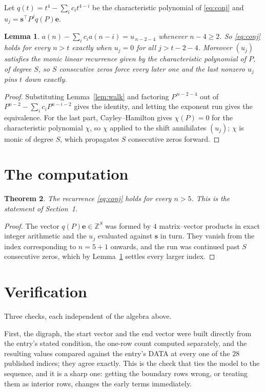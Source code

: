 \documentclass[11pt,a4paper]{article}
\theoremstyle{plain}
\newtheorem{theorem}{Theorem}
\newtheorem{lemma}[theorem]{Lemma}
\theoremstyle{definition}
\begin{document}
Let $q(t)=t^{4}-\sum_i c_i t^{4-i}$ be the characteristic polynomial of
\eqref{eq:conj} and $u_j=\mathbf{s}^{\!\top}P^{j}q(P)\mathbf{e}$.

\begin{lemma}\label{lem:crit}
$a(n)-\sum_i c_i a(n-i)=u_{\,n-2-4}$ whenever $n-4\ge2$. So \eqref{eq:conj}
holds for every $n>t$ exactly when $u_j=0$ for all $j>t-2-4$. Moreover $(u_j)$
satisfies the monic linear recurrence given by the characteristic polynomial of $P$, of
degree $S$, so $S$ consecutive zeros force every later one and the last nonzero $u_j$ pins
$t$ down exactly.
\end{lemma}

\begin{proof}
Substituting Lemma~\ref{lem:walk} and factoring $P^{\,n-2-4}$ out of
$P^{n-2}-\sum_i c_i P^{n-i-2}$ gives the identity, and letting the exponent run gives the
equivalence. For the last part, Cayley--Hamilton gives $\chi(P)=0$ for the characteristic
polynomial $\chi$, so $\chi$ applied to the shift annihilates $(u_j)$; $\chi$ is monic of
degree $S$, which propagates $S$ consecutive zeros forward.
\end{proof}

\section{The computation}

\begin{theorem}
The recurrence \eqref{eq:conj} holds for every $n>5$. This is the statement of
Section~1.
\end{theorem}

\begin{proof}
The vector $q(P)\mathbf{e}\in\mathbb{Z}^{S}$ was formed by $4$ matrix--vector
products in exact integer arithmetic and the $u_j$ evaluated against $\mathbf{s}$ in turn.
They vanish from the index corresponding to $n=5+1$ onwards, and the run was continued
past $S$ consecutive zeros, which by Lemma~\ref{lem:crit} settles every larger index.
\end{proof}

\section{Verification}

Three checks, each independent of the algebra above.

First, the digraph, the start vector and the end vector were built directly from the
entry's stated condition, the one-row count computed separately, and the resulting values
compared against the entry's DATA at every one of the $28$ published indices; they
agree exactly. This is the check that ties the model to the sequence, and it is a sharp one:
getting the boundary rows wrong, or treating them as interior rows, changes the early terms
immediately.
\end{document}
